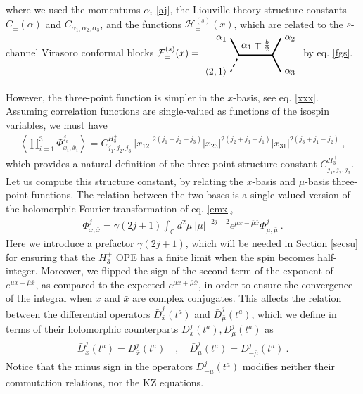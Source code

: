 \documentclass[12pt, a4paper, notitlepage, twoside]{report}
\numberwithin{equation}{section}
\theoremstyle{break}
\begin{document}
where we used the momentums $\alpha_i$ \eqref{aj}, the Liouville theory structure constants $C_\pm(\alpha)$ and $C_{\alpha_1,\alpha_2,\alpha_3}$, and the functions $\mathcal{H}^{(s)}_\pm(x)$, which are related to the 
$s$-channel Virasoro conformal blocks  
$
 \mathcal{F}^{(s)}_\pm(x)  =  
\begin{tikzpicture}[baseline=(current  bounding  box.center), very thick, scale = .3]
\draw (-1,2) node [left] {$\alpha_1$} -- (0,0) -- node [above] {$\alpha_1\mp \frac{b}{2}$} (4,0) -- (5,2) node [right] {$\alpha_2$};
\draw[dashed] (-1,-2) node [left] {$\langle 2,1 \rangle$} -- (0,0);
\draw (4,0) -- (5,-2) node [right] {$\alpha_3$};
\end{tikzpicture}
$
by eq. \eqref{fgs}. 


However, the three-point function is simpler in the $x$-basis, see eq. \eqref{xxx}.
Assuming correlation functions are single-valued as functions of the isospin variables, we must have
\begin{align}
  \left\langle \prod_{i=1}^3 \Phi^{j_i}_{x_i,\bar{x}_i} \right\rangle = C^{H_3^+}_{j_1,j_2,j_3}\ |x_{12}|^{2(j_1+j_2-j_3)} |x_{23}|^{2(j_2+j_3-j_1)} |x_{31}|^{2(j_3+j_1-j_2)}\ ,
\label{ch}
\end{align}
which provides a natural definition of the three-point structure constant $C^{H_3^+}_{j_1,j_2,j_3}$.
Let us compute this structure constant, by relating the $x$-basis and $\mu$-basis three-point functions.
The relation between the two bases is a single-valued version of the holomorphic Fourier transformation of eq. \eqref{emx}, 
\begin{align}
 \Phi^j_{x,\bar{x}} = \gamma(2j+1)\int_{{\mathbb{C}}} d^2\mu\ |\mu|^{-2j-2} e^{\mu x -\bar{\mu}\bar{x}}\Phi^j_{\mu,\bar{\mu}}\ .
\end{align}
Here we introduce a prefactor $\gamma(2j+1)$, which will be needed in Section \ref{secsu} for ensuring that the $H_3^+$ OPE has a finite limit when the spin becomes half-integer.
Moreover, we flipped the sign of the second term of the exponent of $e^{\mu x -\bar{\mu}\bar{x}}$, as compared to the expected $e^{\mu x +\bar{\mu}\bar{x}}$, in order to ensure the convergence of the integral when $x$ and $\bar{x}$ are complex conjugates.
This affects the relation between the differential operators $\bar{D}^j_{\bar{x}}(t^a)$ and $\bar{D}^j_{\bar{\mu}}(t^a)$, which we define in terms of their holomorphic counterparts $D^j_x(t^a), D^j_\mu(t^a)$ as 
\begin{align}
 \bar{D}^j_{\bar{x}}(t^a) = D^j_{\bar{x}}(t^a)  \quad , \quad \bar{D}^j_{\bar{\mu}}(t^a) = D^j_{-\bar{\mu}}(t^a)\ . 
\end{align}
Notice that the minus sign in the operators $D^j_{-\bar{\mu}}(t^a)$ modifies neither their commutation relations, nor the KZ equations.
\end{document}
